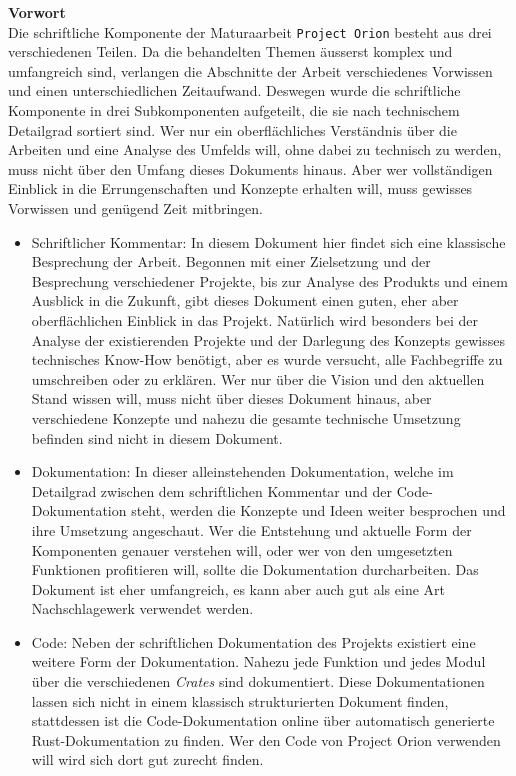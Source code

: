 \documentclass[a4paper,11pt,titlepage,twoside]{memoir}
\begin{document}
\textbf{Vorwort}\\
Die schriftliche Komponente der Maturaarbeit \texttt{Project Orion} besteht aus
drei verschiedenen Teilen. Da die behandelten Themen äusserst komplex
und umfangreich sind, verlangen die Abschnitte der Arbeit
verschiedenes Vorwissen und einen unterschiedlichen Zeitaufwand.
Deswegen wurde die schriftliche Komponente in drei Subkomponenten
aufgeteilt, die sie nach technischem Detailgrad sortiert sind. Wer nur
ein oberflächliches Verständnis über die Arbeiten und eine Analyse des
Umfelds will, ohne dabei zu technisch zu werden, muss nicht über den
Umfang dieses Dokuments hinaus. Aber wer vollständigen Einblick in die
Errungenschaften und Konzepte erhalten will, muss gewisses Vorwissen
und genügend Zeit mitbringen.
\begin{itemize}
\item Schriftlicher Kommentar: In diesem Dokument hier findet sich eine
klassische Besprechung der Arbeit. Begonnen mit einer Zielsetzung
und der Besprechung verschiedener Projekte, bis zur Analyse des
Produkts und einem Ausblick in die Zukunft, gibt dieses Dokument
einen guten, eher aber oberflächlichen Einblick in das Projekt.
Natürlich wird besonders bei der Analyse der existierenden Projekte
und der Darlegung des Konzepts gewisses technisches Know-How
benötigt, aber es wurde versucht, alle Fachbegriffe zu umschreiben
oder zu erklären. Wer nur über die Vision und den aktuellen Stand
wissen will, muss nicht über dieses Dokument hinaus, aber
verschiedene Konzepte und nahezu die gesamte technische Umsetzung
befinden sind nicht in diesem Dokument.
\item Dokumentation: In dieser alleinstehenden Dokumentation, welche im
Detailgrad zwischen dem schriftlichen Kommentar und der
Code-Dokumentation steht, werden die Konzepte und Ideen weiter
besprochen und ihre Umsetzung angeschaut. Wer die Entstehung und
aktuelle Form der Komponenten genauer verstehen will, oder wer von
den umgesetzten Funktionen profitieren will, sollte die
Dokumentation durcharbeiten. Das Dokument ist eher umfangreich, es
kann aber auch gut als eine Art Nachschlagewerk verwendet werden.
\item Code: Neben der schriftlichen Dokumentation des Projekts existiert
eine weitere Form der Dokumentation. Nahezu jede Funktion und jedes
Modul über die verschiedenen \emph{Crates} sind dokumentiert. Diese
Dokumentationen lassen sich nicht in einem klassisch strukturierten
Dokument finden, stattdessen ist die Code-Dokumentation online über
automatisch generierte Rust-Dokumentation zu finden. Wer den Code
von Project Orion verwenden will wird sich dort gut zurecht finden.
\end{itemize}
\newpage
\end{document}
